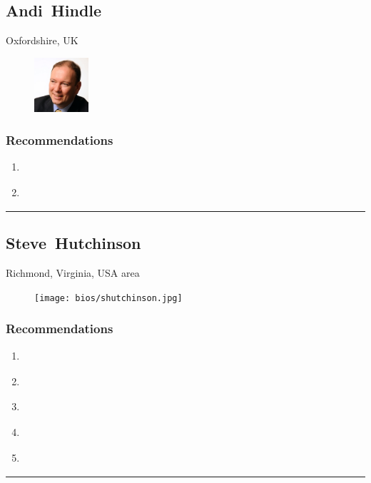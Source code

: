 \subsection{Andi~Hindle} \textsf{Oxfordshire, UK} \par \setlength{\columnsep}{0pt} \begin{figure} \centering \includegraphics[width=0.18\textwidth]{bios/ahindle.jpg} \end{figure}  \subsubsection{Recommendations}\begin{enumerate}
\item \cite{Carlier2018}
\item \cite{Moore1991}
\end{enumerate}\noindent\rule{\textwidth}{0.2pt}

\subsection{Steve~Hutchinson} \textsf{Richmond, Virginia, USA area} \par \setlength{\columnsep}{0pt} \begin{figure} \centering \texttt{[image: bios/shutchinson.jpg]} \end{figure}  \subsubsection{Recommendations}\begin{enumerate}
\item \cite{Birch2014}
\item \cite{Hardjono2016}
\item \cite{Nayyar2018}
\item \cite{Richer2017}
\item \cite{Schwartz2018}
\end{enumerate}\noindent\rule{\textwidth}{0.2pt}

